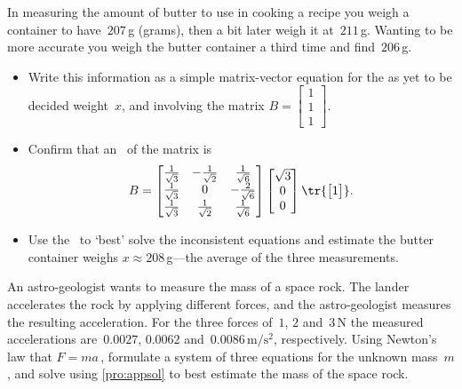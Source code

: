 \begin{exercise} \label{ex:} 
In measuring the amount of butter to use in cooking a recipe you weigh a container to have~\(207\)\,g (grams), then a bit later weigh it at~\(211\)\,g.  
Wanting to be more accurate you weigh the butter container a third time and find~\(206\)\,g.
\begin{itemize}
\item Write this information as a simple matrix-vector equation for the as yet to be decided weight~\(x\), and involving the matrix \(B=\begin{bmatrix} 1\\1\\1 \end{bmatrix}\).
\item Confirm that an \svd\ of the matrix is
\begin{equation*}
B=\begin{bmatrix} \frac1{\sqrt3}&-\frac1{\sqrt2}&\frac1{\sqrt6}
\\\frac1{\sqrt3}&0&-\frac2{\sqrt6}
\\\frac1{\sqrt3}&\frac1{\sqrt2}&\frac1{\sqrt6}\end{bmatrix}
\begin{bmatrix} \sqrt3\\0\\0 \end{bmatrix}
\tr{\begin{bmatrix} 1 \end{bmatrix}}.
\end{equation*}
\item Use the \svd\ to `best' solve the inconsistent equations and estimate the butter container weighs \(x\approx 208\)\,g---the average of the three measurements.
\end{itemize}
\end{exercise}


\begin{comment}
Some of the following adapted from Chong, Ch.~12.
\end{comment}


\begin{exercise} \label{ex:} 
An astro-geologist wants to measure the mass of a space rock.
The lander accelerates the rock by applying different forces, and the astro-geologist measures the resulting acceleration.
For the three forces of~\(1\), \(2\) and~\(3\)\,N the measured accelerations are~\(0.0027\), \(0.0062\) and~\(0.0086\,\text{m}/\text{s}^2\), respectively. 
Using Newton's law that \(F=ma\)\,, formulate a system of three equations for the unknown mass~\(m\), and solve using \autoref{pro:appsol} to best estimate the mass of the space rock.
\end{exercise}


